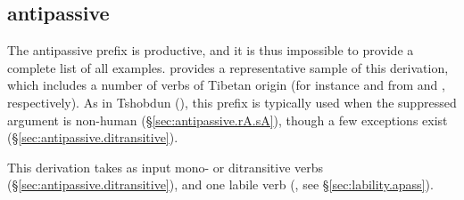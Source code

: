 \subsection{ antipassive} \label{sec:antipassive.rA}
The  antipassive prefix is productive, and it is thus impossible to provide a complete list of all examples.  provides a representative sample of this derivation, which includes a number of verbs of Tibetan origin (for instance  and  from  and , respectively). As in Tshobdun (\citealt[8]{jackson06paisheng}), this prefix is typically used when the suppressed argument is non-human (§\ref{sec:antipassive.rA.sA}), though a few exceptions exist (§\ref{sec:antipassive.ditransitive}). 
 
 This derivation takes as input mono- or ditransitive verbs (§\ref{sec:antipassive.ditransitive}), and one labile verb (, see §\ref{sec:lability.apass}).

